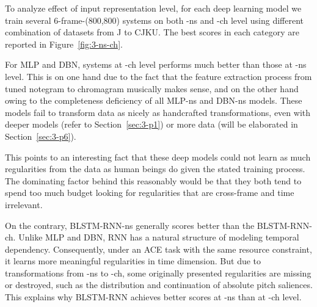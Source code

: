 To analyze effect of input representation level, for each deep learning model we train several 6-frame-(800,800) systems on both -ns and -ch level using different combination of datasets from J to CJKU. The best scores in each category are reported in Figure~\ref{fig:3-ns-ch}.


For MLP and DBN, systems at -ch level performs much better than those at -ns level. This is on one hand due to the fact that the feature extraction process from tuned notegram to chromagram musically makes sense, and on the other hand owing to the completeness deficiency of all MLP-ns and DBN-ns models. These models fail to transform data as nicely as handcrafted transformations, even with deeper models (refer to Section~\ref{sec:3-p1}) or more data (will be elaborated in Section~\ref{sec:3-p6}).

This points to an interesting fact that these deep models could not learn as much regularities from the data as human beings do given the stated training process. The dominating factor behind this reasonably would be that they both tend to spend too much budget looking for regularities that are cross-frame and time irrelevant.

On the contrary, BLSTM-RNN-ns generally scores better than the BLSTM-RNN-ch. Unlike MLP and DBN, RNN has a natural structure of modeling temporal dependency. Consequently, under an ACE task with the same resource constraint, it learns more meaningful regularities in time dimension. But due to transformations from -ns to -ch, some originally presented regularities are missing or destroyed, such as the distribution and continuation of absolute pitch saliences. This explains why BLSTM-RNN achieves better scores at -ns than at -ch level.



